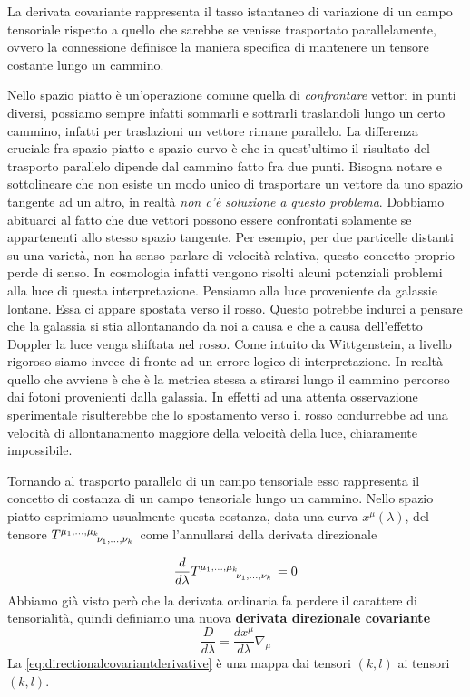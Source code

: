 \documentclass[twoside]{article}
\begin{document}
La derivata covariante rappresenta il tasso istantaneo di variazione di un campo tensoriale rispetto a quello che sarebbe se venisse trasportato parallelamente, ovvero la connessione definisce la maniera specifica di mantenere un tensore costante lungo un cammino.

Nello spazio piatto è un'operazione comune quella di \emph{confrontare} vettori in punti diversi, possiamo sempre infatti sommarli e sottrarli traslandoli lungo un
 certo cammino, infatti per traslazioni un vettore rimane parallelo. La differenza cruciale fra spazio piatto e spazio curvo è che in quest'ultimo il risultato del trasporto parallelo dipende dal cammino fatto fra due punti. Bisogna notare e sottolineare che non esiste un modo unico di trasportare un vettore da uno spazio
 tangente ad un altro, in realtà \emph{non c'è} \emph{soluzione} \emph{a questo problema}. Dobbiamo abituarci al fatto che due vettori possono essere confrontati solamente se appartenenti allo stesso spazio tangente. Per esempio, per due particelle distanti su una varietà, non ha senso parlare di velocità relativa, questo
 concetto proprio perde di senso. In cosmologia infatti vengono risolti alcuni potenziali problemi alla luce di questa interpretazione. Pensiamo alla luce proveniente
 da galassie lontane. Essa ci appare spostata verso il rosso. Questo potrebbe indurci a pensare che la galassia si stia allontanando da noi a causa e che a causa dell'effetto Doppler la luce venga shiftata nel rosso. 
Come intuito da Wittgenstein, a livello rigoroso siamo invece di fronte ad un errore logico di interpretazione. In realtà quello che avviene è che è la metrica stessa
 a stirarsi lungo il cammino percorso dai fotoni provenienti dalla galassia. In effetti ad una attenta osservazione sperimentale risulterebbe che lo spostamento verso il rosso condurrebbe ad una velocità di allontanamento maggiore della velocità della luce, chiaramente impossibile.

Tornando al trasporto parallelo di un campo tensoriale esso rappresenta il concetto di costanza di un campo tensoriale lungo un cammino. Nello spazio piatto esprimiamo usualmente questa costanza, data una curva $x^{\mu}(\lambda)$, del tensore $T\indices{^{\mu_1,\ldots,\mu_k}_{\nu_1,\ldots,\nu_k} }$ come l'annullarsi della derivata direzionale

\begin{equation}\label{eq:paralleltransportflatspace}
	\frac{d}{d\lambda} T\indices{^{\mu_1,\ldots,\mu_k}_{\nu_1,\ldots,\nu_k} } = 0
\end{equation}
Abbiamo già visto però che la derivata ordinaria fa perdere il carattere di tensorialità, quindi definiamo una nuova \textbf{derivata direzionale covariante} 
\begin{equation}\label{eq:directionalcovariantderivative}
	\frac{D}{d\lambda} = \frac{dx^\mu}{d\lambda}\nabla_{\mu}
\end{equation}
La \ref{eq:directionalcovariantderivative} è una mappa dai tensori $(k,l)$ ai tensori $(k,l)$.
\end{document}
